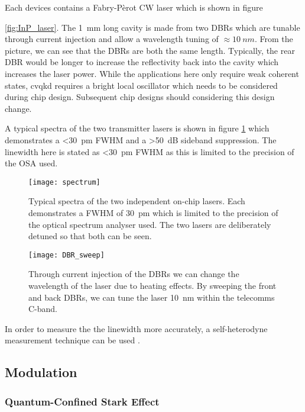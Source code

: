 Each devices contains a Fabry-P\`{e}rot \acl{CW} laser which is shown in figure{\ref{fig:InP_laser}. The \SI{1}{mm} long cavity is made from two \acp{DBR} which are tunable through current injection and allow a wavelength tuning of $\approx \SI{10}{nm}$. From the picture, we can see that the \acp{DBR} are both the same length. Typically, the rear \ac{DBR} would be longer to increase the reflectivity back into the cavity which increases the laser power. While the applications here only require weak coherent states, \ac{cvqkd} requires a bright local oscillator which needs to be considered during chip design. Subsequent chip designs should considering this design change.

A typical spectra of the two transmitter lasers is shown in figure \ref{fig:spectra} which demonstrates a \SI{<30}{pm} \ac{FWHM} and a \SI{>50}{dB} sideband suppression. The linewidth here is stated as \SI{<30}{pm} \ac{FWHM} as this is limited to the precision of the \ac{OSA} used. 

\begin{figure}[tbp]
	\centering
	\texttt{[image: spectrum]}
	\caption[Laser spectrum]{Typical spectra of the two independent on-chip lasers. Each demonstrates a \ac{FWHM} of \SI{30}{pm} which is limited to the precision of the optical spectrum analyser used. The two lasers are deliberately detuned so that both can be seen. }
	\label{fig:spectra}
\end{figure}

\begin{figure}[tbp]
	\centering
	\texttt{[image: DBR\_sweep]}
	\caption[Laser wavelength scan with DBR current injection]{Through current injection of the \acp{DBR} we can change the wavelength of the laser due to heating effects. By sweeping the front and back \acp{DBR}, we can tune the laser \SI{10}{\nm} within the telecomms C-band.}
	\label{fig03:DBR_sweep}
\end{figure}

In order to measure the the linewidth more accurately, a self-heterodyne measurement technique can be used \cite{self-heterodyne}. 

\subsection{Modulation}

\subsubsection{Quantum-Confined Stark Effect}

}
